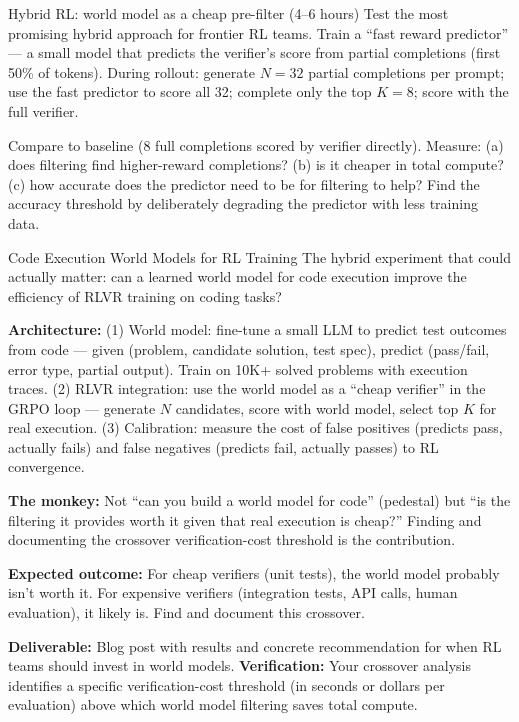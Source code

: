 \begin{exercise}{Hybrid RL: world model as a cheap pre-filter (4--6 hours)}
Test the most promising hybrid approach for frontier RL teams. Train a ``fast reward predictor'' --- a small model that predicts the verifier's score from partial completions (first 50\% of tokens). During rollout: generate $N = 32$ partial completions per prompt; use the fast predictor to score all 32; complete only the top $K = 8$; score with the full verifier.

Compare to baseline (8 full completions scored by verifier directly). Measure: (a) does filtering find higher-reward completions? (b) is it cheaper in total compute? (c) how accurate does the predictor need to be for filtering to help? Find the accuracy threshold by deliberately degrading the predictor with less training data.
\end{exercise}

\begin{portfolio}{Code Execution World Models for RL Training}
The hybrid experiment that could actually matter: can a learned world model for code execution improve the efficiency of RLVR training on coding tasks?

\textbf{Architecture:} (1) World model: fine-tune a small LLM to predict test outcomes from code --- given (problem, candidate solution, test spec), predict (pass/fail, error type, partial output). Train on 10K+ solved problems with execution traces. (2) RLVR integration: use the world model as a ``cheap verifier'' in the GRPO loop --- generate $N$ candidates, score with world model, select top $K$ for real execution. (3) Calibration: measure the cost of false positives (predicts pass, actually fails) and false negatives (predicts fail, actually passes) to RL convergence.

\textbf{The monkey:} Not ``can you build a world model for code'' (pedestal) but ``is the filtering it provides worth it given that real execution is cheap?'' Finding and documenting the crossover verification-cost threshold is the contribution.

\textbf{Expected outcome:} For cheap verifiers (unit tests), the world model probably isn't worth it. For expensive verifiers (integration tests, API calls, human evaluation), it likely is. Find and document this crossover.

\textbf{Deliverable:} Blog post with results and concrete recommendation for when RL teams should invest in world models. \textbf{Verification:} Your crossover analysis identifies a specific verification-cost threshold (in seconds or dollars per evaluation) above which world model filtering saves total compute.
\end{portfolio}

